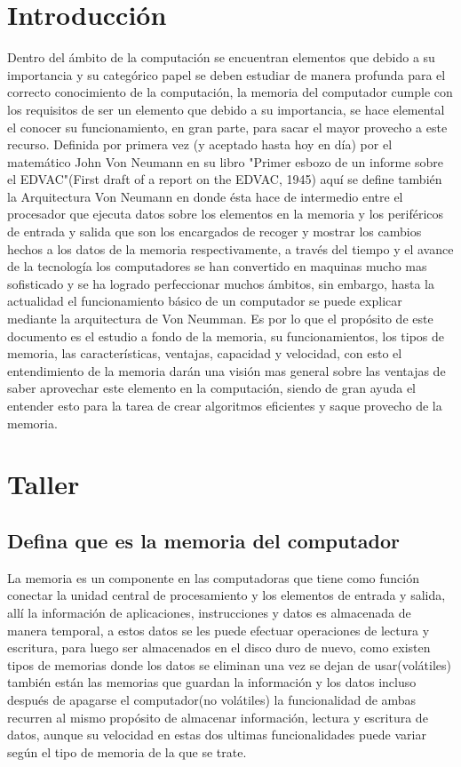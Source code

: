 \section{Introducción}
Dentro del ámbito de la computación se encuentran elementos que debido a su importancia y su categórico papel se deben estudiar de manera profunda para el correcto conocimiento de la computación, la memoria del computador cumple con los requisitos de ser un elemento que debido a su importancia, se hace elemental el conocer su funcionamiento, en gran parte, para sacar el mayor provecho a este recurso. Definida por primera vez (y aceptado hasta hoy en día) por el matemático John Von Neumann en su libro "Primer esbozo de un informe sobre el EDVAC"(First draft of a report on the EDVAC, 1945) aquí se define también la Arquitectura Von Neumann en donde ésta hace de intermedio entre el procesador que ejecuta datos sobre los elementos en la memoria y los periféricos de entrada y salida que son los encargados de recoger y mostrar los cambios hechos a los datos de la memoria respectivamente, a través del tiempo y el avance de la tecnología los computadores se han convertido en maquinas mucho mas sofisticado y se ha logrado perfeccionar muchos ámbitos, sin embargo, hasta la actualidad el funcionamiento básico de un computador se puede explicar mediante la arquitectura de Von Neumman. Es por lo que el propósito de este documento es el estudio a fondo de la memoria, su funcionamientos, los tipos de memoria, las características, ventajas, capacidad y velocidad, con esto el entendimiento de la memoria darán una visión mas general sobre las ventajas de saber aprovechar este elemento en la computación, siendo de gran ayuda el entender esto para la tarea de crear algoritmos eficientes y saque provecho de la memoria. 

\newpage
\section{Taller}

    \subsection{Defina que es la memoria del computador}
    La memoria es un componente en las computadoras que tiene como función conectar la unidad central de procesamiento y los elementos de entrada y salida, allí  la información de aplicaciones, instrucciones y datos es almacenada de manera temporal, a estos datos se les puede efectuar operaciones de lectura y escritura, para luego ser almacenados en el disco duro de nuevo, como existen tipos de memorias donde los datos se eliminan una vez se dejan de usar(volátiles) también están las memorias que guardan la información y los datos incluso después de apagarse el computador(no volátiles) la funcionalidad de ambas recurren al mismo propósito de almacenar información, lectura y escritura de datos, aunque su velocidad en estas dos ultimas funcionalidades puede variar según el tipo de memoria de la que se trate. 
    
